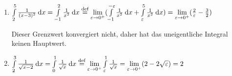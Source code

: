 \item

\begin{enumerate}
\item $\int\limits_2^5 \frac{1}{(x-3)^2}\:\mathrm{d}{x} = \int\limits_{-1}^2 \frac{1}{x^2} \:\mathrm{d}{x} \stackrel{\text{def}}{=} \lim\limits_{\varepsilon\to 0^{+}} (\int\limits_{-1}^{-\varepsilon} \frac{1}{x^2} \:\mathrm{d}{x} + \int\limits_{\varepsilon}^5 \frac{1}{x^2}\:\mathrm{d}{x}) = \lim\limits_{\varepsilon\to 0^{+}} (\frac{2}{\varepsilon} - \frac{3}{2})$

Dieser Grenzwert konvergiert nicht, daher hat das uneigentliche Integral keinen Hauptwert.

\item $\int\limits_2^3 \frac{1}{\sqrt{x-2}}\:\mathrm{d}{x} = \int\limits_0^1 \frac{1}{\sqrt{x}}\:\mathrm{d}{x} \stackrel{\text{def}}{=} \lim\limits_{\varepsilon\to 0^{+}} \int\limits_\varepsilon^1 \frac{1}{\sqrt{x}} = \lim\limits_{\varepsilon\to 0^{+}}(2-2\sqrt{\varepsilon}) = 2$
\end{enumerate}

